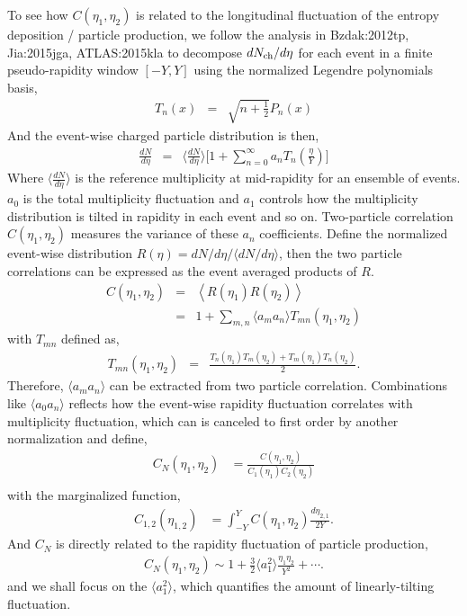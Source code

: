 To see how $C(\eta_1, \eta_2)$ is related to the longitudinal fluctuation of the entropy deposition / particle production, we follow the analysis in  {Bzdak:2012tp, Jia:2015jga, ATLAS:2015kla} to decompose $dN_\text{ch}/d\eta$ for each event in a finite pseudo-rapidity window $[-Y, Y]$ using the normalized Legendre polynomials basis,
\begin{eqnarray}
T_n(x) &=& \sqrt{n + \frac{1}{2}} P_n(x)
\end{eqnarray}
And the event-wise charged particle distribution is then,
\begin{eqnarray}
\frac{dN}{d\eta} &=& \biggl\langle\frac{dN}{d\eta}\biggr\rangle \biggl[1 + \sum_{n=0}^\infty a_n T_n\left(\frac{\eta}{Y}\right) \biggr]
\end{eqnarray}
Where $\biggl\langle\frac{dN}{d\eta}\biggr\rangle$ is the reference multiplicity at mid-rapidity for an ensemble of events.
$a_0$ is the total multiplicity fluctuation and $a_1$ controls how the multiplicity distribution is tilted in rapidity in each event and so on.
Two-particle correlation $C(\eta_1, \eta_2)$ measures the variance of these $a_n$ coefficients.
Define the normalized event-wise distribution $R(\eta) = dN/d\eta /\langle dN/d\eta\rangle$, then the two particle correlations can be expressed as the event averaged products of $R$.
\begin{eqnarray}
C(\eta_1, \eta_2) &=& \left\langle R(\eta_1) R(\eta_2)\right\rangle \\
&=& 1 + \sum_{m, n}\langle a_m a_n\rangle  T_{mn}(\eta_1, \eta_2)
\end{eqnarray}
with $T_{mn}$ defined as,
\begin{eqnarray}
T_{mn}(\eta_1, \eta_2) &=& \frac{T_n(\eta_1)T_m(\eta_2) + T_m(\eta_1)T_n(\eta_2)}{2}.
\end{eqnarray}
Therefore, $
\langle a_m a_n\rangle$ can be extracted from two particle correlation.
Combinations like $\langle a_0 a_n\rangle$ reflects how the event-wise rapidity fluctuation correlates with multiplicity fluctuation, which can is canceled to first order by another normalization and define,
\begin{eqnarray}
 C_N(\eta_1, \eta_2) &= \frac{C(\eta_1, \eta_2)}{C_1(\eta_1)C_2(\eta_2)}\\
\end{eqnarray}
with the marginalized function,
\begin{eqnarray}
C_{1,2}(\eta_{1,2}) &= \int_{-Y}^{Y}C(\eta_1, \eta_2)\frac{d\eta_{2,1}}{2Y}.
\end{eqnarray}
And $C_N$ is directly related to the rapidity fluctuation of particle production,
\begin{eqnarray}
C_N(\eta_1, \eta_2) \sim 1 + \frac{3}{2}\langle a_1 ^2 \rangle \frac{\eta_1\eta_2}{Y^2} + \cdots.
\end{eqnarray}
and we shall focus on the $\langle a_1 ^2 \rangle$, which quantifies the amount of linearly-tilting fluctuation.

